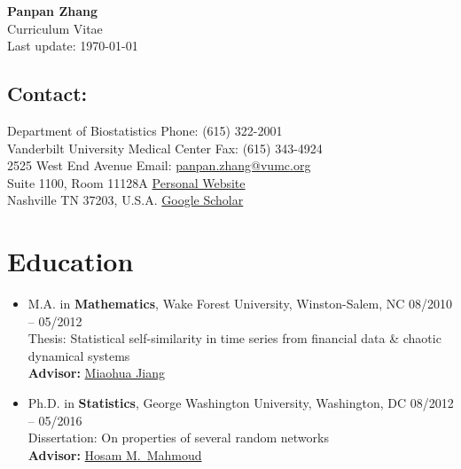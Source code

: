 \documentclass[12pt,letterpaper]{article}
\newenvironment{cventry}{\begin{minipage}[t]{\linewidth}}{\end{minipage}}
\begin{document}
\thispagestyle{empty}

	
	\begin{center}
    {\LARGE\bfseries Panpan Zhang}\\[5pt]
    {\large Curriculum Vitae}\\[5pt]
    {\small Last update: \today}
	\end{center}
	\vspace{2pt}

	\subsection*{Contact:}
	Department of Biostatistics \hfill Phone: (615) 322-2001 \\
	Vanderbilt University Medical Center \hfill Fax: (615) 343-4924 
	\\
	2525 West End Avenue \hfill Email: \href{mailto:panpan.zhang@vumc.org}
	{panpan.zhang@vumc.org} \\
	Suite 1100, Room 11128A \hfill \href{https://panpan-zhang.com/}{Personal Website} \\
	Nashville TN 37203, U.S.A. \hfill \href{https://scholar.google.com/citations?user=XMgB5OYAAAAJ&hl=en}{Google Scholar}
	
	\section*{Education}
	\begin{itemize}
		\item\begin{cventry} M.A. in \textbf{Mathematics}, Wake Forest University, Winston-Salem, NC \hfill 08/2010 -- 05/2012 \\
		Thesis: Statistical self-similarity in time series from financial data \& chaotic dynamical systems \\
		{\bf Advisor:} \href{https://math.wfu.edu/jiang}{Miaohua Jiang}
		\par\end{cventry}
		\item\begin{cventry} Ph.D. in \textbf{Statistics}, George Washington University, Washington, DC \hfill 08/2012 -- 05/2016 \\
		Dissertation: On properties of several random networks \\
		{\bf Advisor:} 
		\href{https://statistics.columbian.gwu.edu/hosam-m-mahmoud}
		{Hosam M.\ Mahmoud}
		\par\end{cventry}
	\end{itemize}
\end{document}
